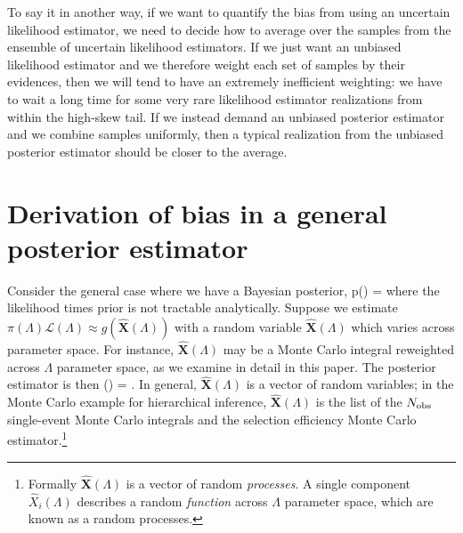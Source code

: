 \documentclass[%
 reprint,
 amsmath,amssymb,
 aps,nofootinbib,nobibnotes,onecolumn,prd
]{revtex4-2}
\begin{document}
To say it in another way, if we want to quantify the bias from using an uncertain likelihood estimator, we need to decide how to average over the samples from the ensemble of uncertain likelihood estimators. If we just want an unbiased likelihood estimator and we therefore weight each set of samples by their evidences, then we will tend to have an extremely inefficient weighting: we have to wait a long time for some very rare likelihood estimator realizations from within the high-skew tail. If we instead demand an unbiased posterior estimator and we combine samples uniformly, then a typical realization from the unbiased posterior estimator should be closer to the average. 

\section{Derivation of bias in a general posterior estimator}
\label{app: bias in general}

Consider the general case where we have a Bayesian posterior, 
\beq
p(\Lambda) = 
\eeq
where the likelihood times prior is not tractable analytically. Suppose we estimate $\pi(\Lambda)\mathcal{L}(\Lambda) \approx g(\hat{\bm X}(\Lambda))$ with a random variable $\hat{\bm X}(\Lambda)$ which varies across parameter space. For instance, $\hat{\bm X}(\Lambda)$ may be a Monte Carlo integral reweighted across $\Lambda$ parameter space, as we examine in detail in this paper. The posterior estimator is then
\beq
{}(\Lambda) = .
\label{eq: estimated posterior}
\eeq
In general, $\hat{\bm X}(\Lambda)$ is a vector of random variables; in the Monte Carlo example for hierarchical inference, $\hat{\bm X}(\Lambda)$ is the list of the $N_{\rm obs}$ single-event Monte Carlo integrals and the selection efficiency Monte Carlo estimator.\footnote{Formally $\hat{\bm X}(\Lambda)$ is a vector of random \textit{processes}. A single component $\hat{X}_i(\Lambda)$ describes a random \textit{function} across $\Lambda$ parameter space, which are known as a random processes.}
\end{document}
